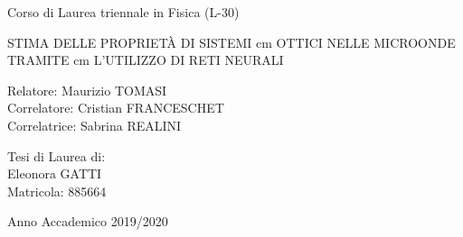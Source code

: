 \documentclass[11pt,a4paper,twoside,
openright]{book}
\begin{document}
\begin{titlepage}
  
  

\begin{center}
{\LARGE Corso di Laurea triennale in Fisica (L-30)}
\end{center}

\vspace{1 cm}
\begin{figure}[h]
    \end{figure}

\begin{center}
\vspace{3 cm}

{\huge {STIMA DELLE PROPRIETÀ DI SISTEMI} }
 cm
{\huge {OTTICI NELLE MICROONDE TRAMITE} }
 cm
{\huge {L'UTILIZZO DI RETI NEURALI} }

\end{center}
\par
  \vspace{3 cm}
  
  \begin{flushleft}
       Relatore: Maurizio TOMASI \\
     
       \noindent Correlatore: Cristian FRANCESCHET \\
       \noindent Correlatrice: Sabrina REALINI
  \end{flushleft}
  \vspace{1 cm}
  \begin{flushright}
    Tesi di Laurea di:\\ Eleonora GATTI\\ Matricola: 885664
  \end{flushright}
        
\vfill
\begin{center}
  {\large Anno Accademico 2019/2020}
\end{center}
\end{titlepage}
\end{document}

